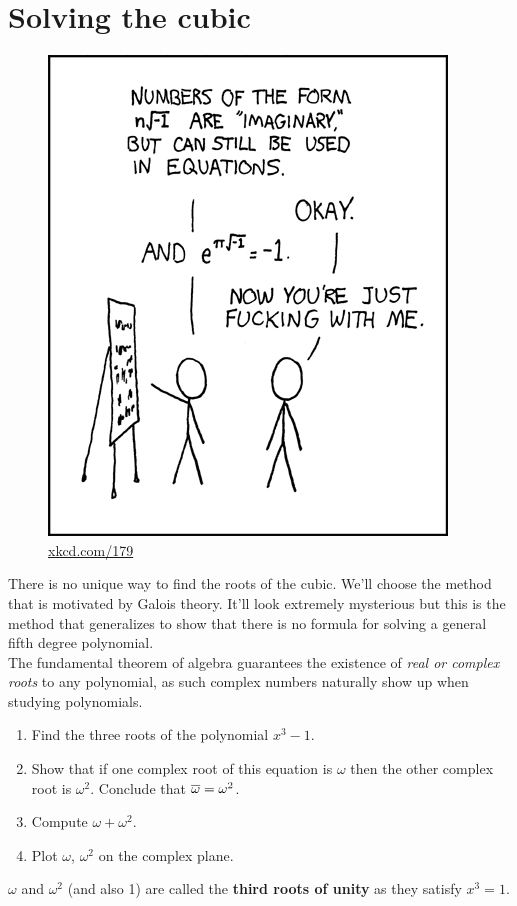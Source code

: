 
\section{Solving the cubic}
\begin{figure}[H]
	\begin{flushright}
	\includegraphics[width=0.6\linewidth]{resources/179.png}
	\caption*{\href{https://xkcd.com/179/}{\tiny {xkcd.com/179}}}
\end{flushright}
\end{figure}	

There is no unique way to find the roots of the cubic. We'll choose the method that is motivated by Galois theory. It'll look extremely mysterious but this is the method that generalizes to show that there is no formula for solving a general fifth degree polynomial.\\

The fundamental theorem of algebra guarantees the existence of \emph{real or complex roots} to any polynomial, as such complex numbers naturally show up when studying polynomials. 

\begin{questions}
	\item 
	\begin{enumerate}
		\item Find the three roots of the polynomial $ x^3 - 1$.
		\item Show that if one complex root of this equation is $ \omega $ then the other complex root is $ \omega^2$. Conclude that $ \overline{\omega} = \omega^2$.
    \item Compute $ \omega + \omega^2$.
		\item Plot $ \omega$, $\omega^2$ on the complex plane.
	\end{enumerate}
  $ \omega$ and $ \omega^2$ (and also 1) are called the \textbf{third roots of unity} as they satisfy $ x^3 = 1$.
\end{questions}


